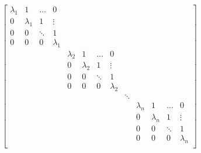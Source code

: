 \documentclass{article}
\begin{document}
\begin{align*}
		\begin{bmatrix}
		\lambda_{1} & 1           & \ldots & 0           &             &             &        &             &        &             &             &        &             \\
		0           & \lambda_{1} & 1      & \vdots      &             &             &        &             &        &             &             &        &             \\
		0           & 0           & \ddots & 1           &             &             &        &             &        &             &             &        &             \\
		0           & 0           & 0      & \lambda_{1} &             &             &        &             &        &             &             &        &             \\
		            &             &        &             & \lambda_{2} & 1           & \ldots & 0           &        &             &             &        &             \\
		            &             &        &             & 0           & \lambda_{2} & 1      & \vdots      &        &             &             &        &             \\
		            &             &        &             & 0           & 0           & \ddots & 1           &        &             &             &        &             \\
		            &             &        &             & 0           & 0           & 0      & \lambda_{2} &        &             &             &        &             \\
		            &             &        &             &             &             &        &             & \ddots &             &             &        &             \\
		            &             &        &             &             &             &        &             &        & \lambda_{n} & 1           & \ldots & 0           \\
		            &             &        &             &             &             &        &             &        & 0           & \lambda_{n} & 1      & \vdots      \\
		            &             &        &             &             &             &        &             &        & 0           & 0           & \ddots & 1           \\
		            &             &        &             &             &             &        &             &        & 0           & 0           & 0      & \lambda_{n} \\
	\end{bmatrix}
\end{align*}
\end{document}
